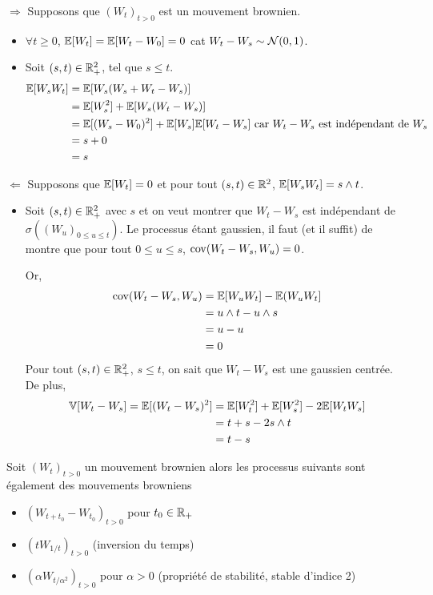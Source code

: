\Preuve 
$\Rightarrow$ Supposons que $(W_t)_{t>0}$ est un mouvement brownien.
\begin{itemize}
  \item $\forall t\geq 0$, $\mathbb{E}[W_t] = \mathbb{E}[W_t-W_0] = 0$ cat $W_t-W_s \sim \mathcal{N}(0,1)$.
  \item Soit $(s,t) \in \mathbb{R}^2_+$, tel que $s\leq t$.
   \begin{equation*}
    \begin{split}
     \mathbb{E}[W_sW_t] &= \mathbb{E}[W_s(W_s+W_t-W_s)] \\
     &= \mathbb{E}[W_s^2] + \mathbb{E}[W_s(W_t-W_s)] \\
      &= \mathbb{E}[(W_s-W_0)^2] + \mathbb{E}[W_s]\mathbb{E}[W_t-W_s] \text{ car $W_t - W_s$ est indépendant de $W_s$} \\
      &= s + 0 \\
      &= s
    \end{split} 
   \end{equation*} 
\end{itemize}
$\Leftarrow$ Supposons que $\mathbb{E}[W_t] = 0$ et pour tout $(s,t) \in \mathbb{R}^2$, $\mathbb{E}[W_sW_t] = s \wedge t$. 
\begin{itemize}
  \item Soit $(s,t) \in \mathbb{R}^2_+$ avec $s$ et on veut montrer que $W_t -W_s$ est indépendant de $\sigma((W_u)_{0 \leq u \leq t})$. Le processus étant gaussien, il faut (et il suffit) de montre que pour tout $0 \leq u \leq s$, $\mathrm{cov}(W_t-W_s, W_u) = 0$.

Or,
\begin{equation*}
\begin{split}
  \mathrm{cov}(W_t-W_s,W_u) &= \mathbb{E}[W_uW_t] - \mathbb{E}(W_uW_t] \\
  &= u\wedge t - u\wedge s \\
  &= u - u \\
  &= 0
\end{split}
\end{equation*}
  Pour tout $(s,t) \in \mathbb{R}^2_+$, $s\leq t$, on sait que $W_t-W_s$ est une gaussien centrée. De plus,
    \begin{equation*}
    \begin{split}
      \mathbb{V}[W_t -W_s ] = \mathbb{E}[(W_t-W_s)^2] &= \mathbb{E}[W_t^2] + \mathbb{E}[W_s^2] - 2\mathbb{E}[W_tW_s] \\
      &= t + s - 2 s\wedge t \\
      &= t - s
    \end{split}
    \end{equation*}
\end{itemize}

\begin{cor}
  Soit $(W_t)_{t>0}$ un mouvement brownien alors les processus suivants sont également des mouvements browniens
  \begin{itemize}
    \item $(W_{t+t_0} - W_{t_0})_{t>0}$ pour $t_0 \in \mathbb{R}_+$
    \item $(tW_{1/t})_{t>0}$ (inversion du temps)
    \item $(\alpha W_{t/\alpha^2})_{t>0}$ pour $\alpha > 0$ (propriété de stabilité, stable d'indice 2)
  \end{itemize}
\end{cor}


